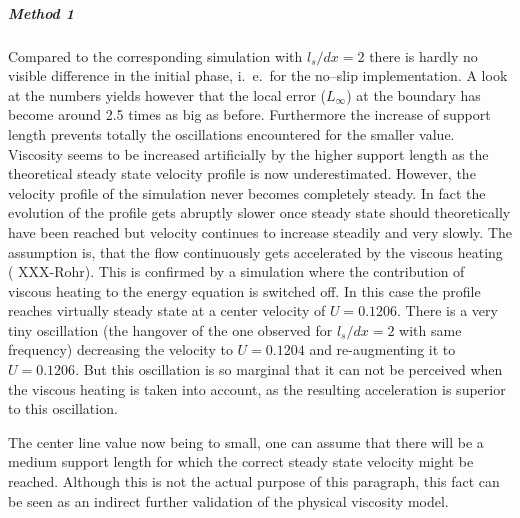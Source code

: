 \documentclass{report}
\begin{document}
\subparagraph{Method 1}
Compared to the corresponding simulation with $l_s/dx=2$ there is hardly no visible difference in the initial phase, i.\ e.\ for the no--slip implementation. A look at the numbers yields however that the local error ($L_\infty$) at the boundary has become around 2.5 times as big as before. Furthermore the increase of support length prevents totally the oscillations encountered for the smaller value. Viscosity seems to be increased artificially by the higher support length as the theoretical steady state velocity profile is now underestimated. However, the velocity profile of the simulation never becomes completely steady. In fact the evolution of the profile gets abruptly slower once steady state should theoretically have been reached  but velocity continues to increase steadily and very slowly. The assumption is, that the flow continuously gets accelerated by the viscous heating ( XXX-Rohr). This is confirmed by a simulation where the contribution of viscous heating to the energy equation is switched off. In this case the profile reaches virtually steady state at a center velocity of $U=0.1206$. There is a very tiny oscillation (the hangover of the one observed for $l_s/dx=2$ with same frequency) decreasing the velocity to $U=0.1204$ and re-augmenting it to $U=0.1206$. But this oscillation is so marginal that it can not be perceived when the viscous heating is taken into account, as the resulting acceleration is superior to this oscillation. 

The center line value now being to small, one can assume that there will be a medium support length for which the correct steady state velocity might be reached. Although this is not the actual purpose of this paragraph, this fact can be seen as an indirect further validation of the physical viscosity model.
\end{document}
